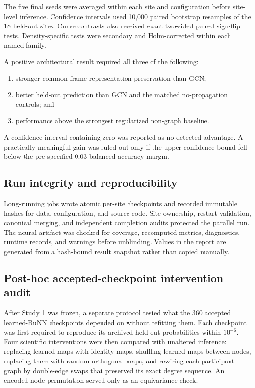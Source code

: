\documentclass[11pt,a4paper]{article}
\begin{document}
The five final seeds were averaged within each site and configuration before
site-level inference. Confidence intervals used 10,000 paired bootstrap
resamples of the 18 held-out sites. Curve contrasts also received exact
two-sided paired sign-flip tests. Density-specific tests were secondary and
Holm-corrected within each named family.

A positive architectural result required all three of the following:
\begin{enumerate}
  \item stronger common-frame representation preservation than GCN;
  \item better held-out prediction than GCN and the matched no-propagation
  controls; and
  \item performance above the strongest regularized non-graph baseline.
\end{enumerate}

A confidence interval containing zero was reported as no detected advantage.
A practically meaningful gain was ruled out only if the upper confidence
bound fell below the pre-specified 0.03 balanced-accuracy margin.

\subsection{Run integrity and reproducibility}

Long-running jobs wrote atomic per-site checkpoints and recorded immutable
hashes for data, configuration, and source code. Site ownership, restart
validation, canonical merging, and independent completion audits protected
the parallel run. The neural artifact was checked for coverage, recomputed
metrics, diagnostics, runtime records, and warnings before unblinding. Values
in the report are generated from a hash-bound result snapshot rather than
copied manually.

\subsection{Post-hoc accepted-checkpoint intervention audit}

After Study 1 was frozen, a separate protocol tested what the 360 accepted
learned-BuNN checkpoints depended on without refitting them. Each checkpoint
was first required to reproduce its archived held-out probabilities within
$10^{-6}$. Four scientific interventions were then compared with unaltered
inference: replacing learned maps with identity maps, shuffling learned maps
between nodes, replacing them with random orthogonal maps, and rewiring each
participant graph by double-edge swaps that preserved its exact degree
sequence. An encoded-node permutation served only as an equivariance check.
\end{document}
